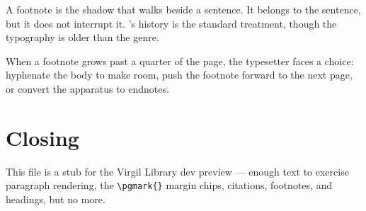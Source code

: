 \documentclass{article}
\begin{document}
A footnote is the shadow that walks beside a sentence. It belongs to the
sentence, but it does not interrupt it. \cite{grafton2020}'s history is
the standard treatment, though the typography is older than the genre.

When a footnote grows past a quarter of the page, the typesetter
faces a choice: hyphenate the body to make room, push the footnote
forward to the next page, or convert the apparatus to endnotes.

\section{Closing}

This file is a stub for the Virgil Library dev preview --- enough text
to exercise paragraph rendering, the \verb|\pgmark{}| margin chips,
citations, footnotes, and headings, but no more.
\end{document}
